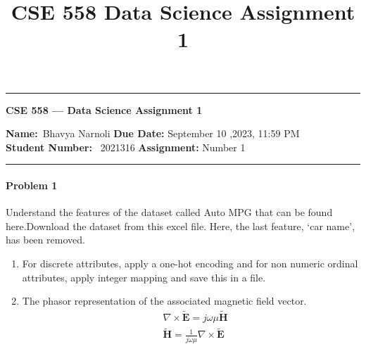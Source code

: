 \documentclass[12pt]{scrartcl}
\title{CSE 558 Data Science Assignment 1}
\begin{document}
\begin{center}
	\hrule
	\vspace{.4cm}
	{\textbf { \large CSE 558 --- Data Science Assignment 1}}
\end{center}
{\textbf{Name:}\ Bhavya Narnoli \hspace{\fill} \textbf{Due Date:} September 10 ,2023, 11:59 PM   \\
{ \textbf{Student Number:}} \ 2021316 \hspace{\fill} \textbf{Assignment:} Number 1 \\
	\hrule

\paragraph*{Problem 1} %
Understand the features of the dataset called Auto MPG that can be found here.Download the dataset from this excel file. Here, the last feature, ‘car name’, has been removed.
\begin{enumerate}[label=(\alph*)]
\item For discrete attributes, apply a one-hot encoding and for non numeric ordinal attributes, apply integer mapping and save this in a file. \newline 
\item The phasor representation of the associated magnetic field vector. \newline 
\begin{align*}
& \nabla \times \tilde{\mathbf{E}} = j \omega \mu  \tilde{\mathbf{H}} \\
& \tilde{\mathbf{H}}=\frac{1}{j \omega \mu }  \nabla \times \tilde{\mathbf{E}}
\end{align*}


\end{enumerate}}
\end{document}
